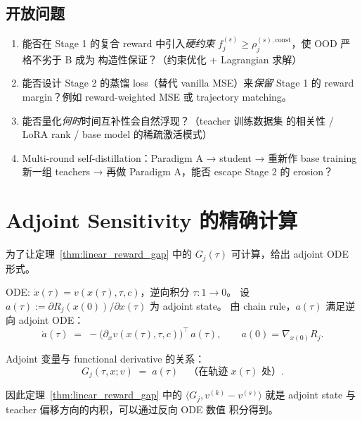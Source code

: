 \documentclass[11pt,a4paper]{article}
\newcommand{\const}{\mathrm{const}}
\theoremstyle{definition}
\begin{document}
\subsection{开放问题}

\begin{enumerate}[leftmargin=1.5em]
\item 能否在 Stage 1 的复合 reward 中引入\emph{硬约束}
$f_j^{(s)} \geq \rho_j^{(s), \const}$，使 OOD 严格不劣于 B 成为
构造性保证？（约束优化 + Lagrangian 求解）
\item 能否设计 Stage 2 的蒸馏 loss（替代 vanilla MSE）来\emph{保留}
Stage 1 的 reward margin？例如 reward-weighted MSE 或 trajectory
matching。
\item 能否量化\emph{何时}时间互补性会自然浮现？（teacher 训练数据集
的相关性 / LoRA rank / base model 的稀疏激活模式）
\item Multi-round self-distillation：Paradigm A → student → 重新作 base
training 新一组 teachers → 再做 Paradigm A，能否 escape Stage 2 的
erosion？
\end{enumerate}

\appendix
\section{Adjoint Sensitivity 的精确计算}
\label{app:adjoint}

为了让定理~\ref{thm:linear_reward_gap} 中的 $G_j(\tau)$ 可计算，给出
adjoint ODE 形式。

ODE: $\dot x(\tau) = v(x(\tau), \tau, c)$，逆向积分 $\tau: 1 \to 0$。
设 $a(\tau) := \partial R_j(x(0)) / \partial x(\tau)$ 为 adjoint state。
由 chain rule，$a(\tau)$ 满足逆向 adjoint ODE：
\begin{equation}
\dot a(\tau) \;=\; -\bigl(\partial_x v(x(\tau), \tau, c)\bigr)^\top\,a(\tau),
\qquad a(0) = \nabla_{x(0)} R_j.
\end{equation}

Adjoint 变量与 functional derivative 的关系：
\begin{equation}
G_j(\tau, x; v) \;=\; a(\tau)\quad\text{（在轨迹 } x(\tau) \text{ 处）}.
\end{equation}

因此定理~\ref{thm:linear_reward_gap} 中的 $\langle G_j, v^{(k)} - v^{(s)}\rangle$
就是 adjoint state 与 teacher 偏移方向的内积，可以通过反向 ODE 数值
积分得到。

\end{document}
